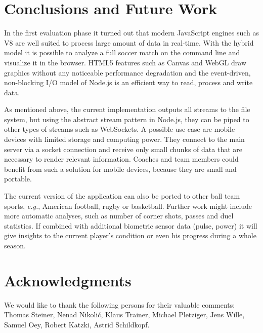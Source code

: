 \documentclass{sig-alternate}
\begin{document}
\section{Conclusions and Future Work}
\label{sec:conclusions-future-work}

In the first evaluation phase it turned out
that modern JavaScript engines such as V8
are well suited to process large amount of data in real-time.
With the hybrid model it is possible to analyze a full soccer match
on the command line and visualize it in the browser.
HTML5 features such as Canvas and WebGL draw graphics
without any noticeable performance degradation
and the event-driven, non-blocking I/O model of Node.js
is an efficient way to read, process and write data.

As mentioned above, the current implementation
outputs all streams to the file system,
but using the abstract stream pattern in Node.js,
they can be piped to other types of streams such as WebSockets.
A possible use case are mobile devices with limited storage
and computing power.
They connect to the main server via a socket connection
and receive only small chunks of data that are necessary
to render relevant information.
Coaches and team members could benefit from such a solution
for mobile devices, because they are small and portable.

The current version of the application can also be ported
to other ball team sports, \emph{e.g.}, American football,
rugby or basketball.
Further work might include more automatic analyses,
such as number of corner shots, passes and duel statistics.
If combined with additional biometric sensor data (pulse, power)
it will give insights to the current player’s condition
or even his progress during a whole season.

\section*{Acknowledgments}
We would like to thank the following persons for their valuable comments: Thomas Steiner, Nenad Nikolić, Klaus Trainer, Michael Pletziger, Jens Wille, Samuel Oey, Robert Katzki, Astrid Schildkopf.



\end{document}
